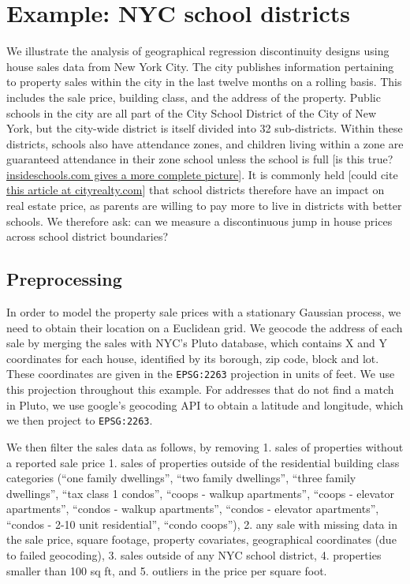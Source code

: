 \documentclass[letter]{article}
\begin{document}
    	\section{Example: NYC school districts}\label{example-nyc-school-districts}

We illustrate the analysis of geographical regression discontinuity designs using house sales data from New York City.
The city publishes information pertaining to property sales within the city in the last twelve months on a rolling basis.
This includes the sale price, building class, and the address of the property.
Public schools in the city are all part of the City School District of the City of New York, but the city-wide district is itself divided into 32 sub-districts.
Within these districts, schools also have attendance zones, and children living within a zone are guaranteed attendance in their zone school unless the school is full {[}is this true? \href{http://insideschools.org/elementary/how-to-apply}{insideschools.com gives a more complete picture}{]}.
It is commonly held {[}could cite \href{https://www.cityrealty.com/nyc/market-insight/features/trending-in-ny/buying-renting-school-zone-district-what-you-need-know/3661}{this article at cityrealty.com}{]} that school districts therefore have an impact on real estate price, as parents are willing to pay more to live in districts with better schools.
We therefore ask: can we measure a discontinuous jump in house prices across school district boundaries?
    


    	\subsection{Preprocessing}\label{preprocessing}

In order to model the property sale prices with a stationary Gaussian process, we need to obtain their location on a Euclidean grid. We geocode the address of each sale by merging the sales with NYC's Pluto database, which contains X and Y coordinates for each house, identified by its borough, zip code, block and lot. These coordinates are given in the \texttt{EPSG:2263} projection in units of feet. We use this projection throughout this example. For addresses that do not find a match in Pluto, we use google's geocoding API to obtain a latitude and longitude, which we then project to \texttt{EPSG:2263}.

We then filter the sales data as follows, by removing
1. sales of properties without a reported sale price
1. sales of properties outside of the residential building class categories (``one family dwellings'', ``two family dwellings'', ``three family dwellings'', ``tax class 1 condos'', ``coops - walkup apartments'', ``coops - elevator apartments'', ``condos - walkup apartments'', ``condos - elevator apartments'', ``condos - 2-10 unit residential'', ``condo coops''),
2. any sale with missing data in the sale price, square footage, property covariates, geographical coordinates (due to failed geocoding),
3. sales outside of any NYC school district,
4. properties smaller than 100 sq ft, and
5. outliers in the price per square foot.
    
\end{document}
